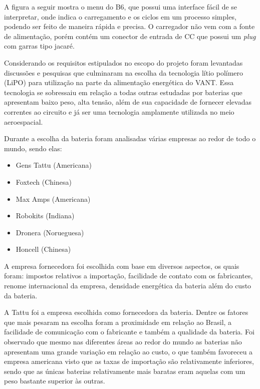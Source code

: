 A figura a seguir mostra o menu do B6, que possui uma interface fácil de se interpretar, onde indica o carregamento e os ciclos em um processo simples, podendo ser feito de maneira rápida e precisa. O carregador não vem com a fonte de alimentação, porém contém um conector de entrada de CC que possui um \textit{plug} com garras tipo jacaré.




Considerando os requisitos estipulados  no escopo do projeto foram levantadas discussões e pesquisas que culminaram na escolha da tecnologia lítio polímero (LiPO) para utilização na parte da alimentação energética do VANT. Essa tecnologia se sobressaiu em relação a todas outras estudadas por baterias que apresentam baixo peso, alta tensão, além de sua capacidade de fornecer elevadas correntes ao circuito e já ser uma tecnologia amplamente utilizada no meio aeroespacial.

Durante a escolha da bateria foram analisadas várias empresas ao redor de todo o mundo, sendo elas:

\begin{itemize}
 
\item Gens Tattu (Americana)

\item Foxtech (Chinesa)

\item Max Amps (Americana)

\item Robokits (Indiana)

\item Dronera (Norueguesa)

\item Honcell (Chinesa)

\end{itemize}


A empresa fornecedora foi escolhida com base em diversos aspectos, os quais foram: impostos relativos a importação, facilidade de contato com os fabricantes, renome internacional da empresa, densidade energética da bateria além do custo da bateria.

A  Tattu foi a empresa escolhida como fornecedora da bateria.  Dentre os fatores que mais pesaram na escolha foram a proximidade em relação ao Brasil, a facilidade de comunicação com o fabricante e também a qualidade da bateria. Foi observado que mesmo nas diferentes áreas ao redor do mundo as baterias não apresentam uma grande variação em relação ao custo, o que também favoreceu a empresa americana visto que as taxas de importação são relativamente inferiores, sendo que as únicas baterias relativamente mais baratas eram aquelas com um peso bastante superior às outras.

